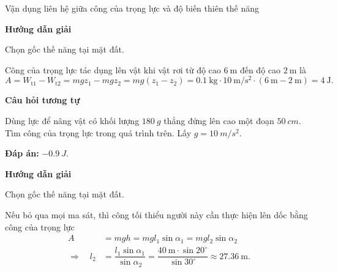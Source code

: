\begin{dang}{Vận dụng liên hệ giữa công của trọng lực  và độ biến thiên thế năng }
	
	{\begin{center}
			\textbf{Hướng dẫn giải}
		\end{center}
		
		Chọn gốc thế năng tại mặt đất.
		
		Công của trọng lực tác dụng lên vật khi vật rơi từ độ cao $\SI{6}{\meter}$ đến độ cao $\SI{2}{\meter}$ là
		\begin{equation*}
			A=W_{\text{t}1}-W_{\text{t}2}=mgz_1-mgz_2=mg(z_1-z_2)=\SI{0,1}{\kilogram}\cdot\SI{10}{\meter/\second^2}\cdot(\SI{6}{\meter}-\SI{2}{\meter})=\SI{4}{\joule}.
		\end{equation*}
		
		\begin{center}
			\textbf{Câu hỏi tương tự}
		\end{center}
		
		Dùng lực để nâng vật có khối lượng $\SI{180}{g}$ thẳng đứng lên cao một đoạn $\SI{50}{cm}$. Tìm công của trọng lực trong quá trình trên. Lấy $g=\SI{10}{m/s^2}$.
		
		\textbf{Đáp án:} $\SI{-0.9}{J}$.
	}
	{\begin{center}
			\textbf{Hướng dẫn giải}
		\end{center}
		
		Chọn gốc thế năng tại mặt đất.
		
		Nếu bỏ qua mọi ma sát, thì công tối thiểu người này cần thực hiện lên dốc bằng công của trọng lực
		\begin{align*}
			A&=mgh=mgl_1\sin\alpha_1=mgl_2\sin\alpha_2\\
			\Rightarrow\quad l_2&=\dfrac{l_1\sin\alpha_1}{\sin\alpha_2}=\dfrac{\SI{40}{\meter}\cdot\sin 20^\circ}{\sin 30^\circ}\approx\SI{27,36}{\meter}.
		\end{align*}
	}
\end{dang}


